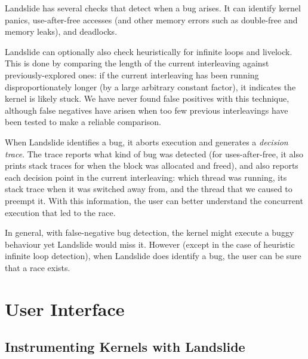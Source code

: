 \documentclass{llncs}
\begin{document}
Landslide has several checks that detect when a bug arises. It can identify kernel panics, use-after-free accesses (and other memory errors such as double-free and memory leaks), and deadlocks.

Landslide can optionally also check heuristically for infinite loops and livelock. This is done by comparing the length of the current interleaving against previously-explored ones: if the current interleaving has been running disproportionately longer (by a large arbitrary constant factor), it indicates the kernel is likely stuck.
We have never found false positives with this technique, although false negatives have arisen when too few previous interleavings have been tested to make a reliable comparison.

When Landslide identifies a bug, it aborts execution and generates a {\em decision trace}. The trace reports what kind of bug was detected (for uses-after-free, it also prints stack traces for when the block was allocated and freed), and also reports each decision point in the current interleaving: which thread was running, its stack trace when it was switched away from, and the thread that we caused to preempt it. With this information, the user can better understand the concurrent execution that led to the race.

In general, with false-negative bug detection, the kernel might execute a buggy behaviour yet Landslide would miss it. However (except in the case of heuristic infinite loop detection), when Landslide does identify a bug, the user can be sure that a race exists.


\section{User Interface}
\label{sec:interface}

\subsection{Instrumenting Kernels with Landslide}
\label{sec:instrument}
\end{document}
